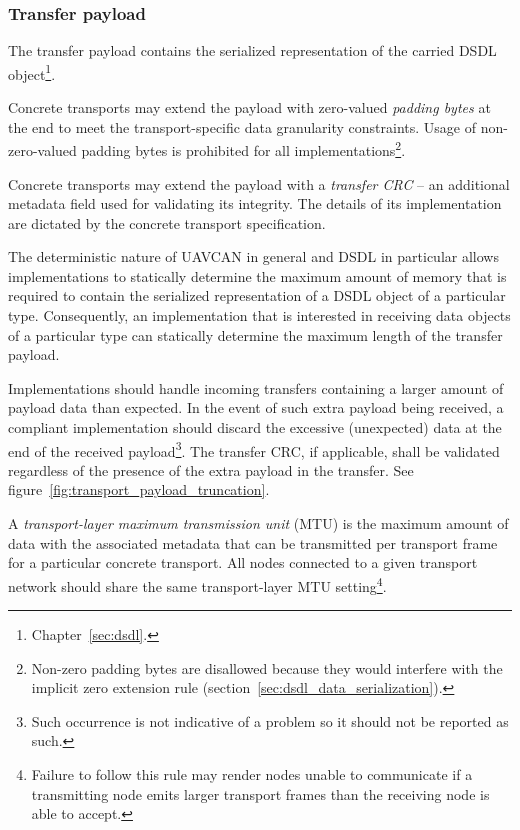 \subsubsection{Transfer payload}\label{sec:transport_transfer_payload}

The transfer payload contains the serialized representation of the carried
DSDL object\footnote{Chapter~\ref{sec:dsdl}.}.

Concrete transports may extend the payload with zero-valued \emph{padding bytes} at the end
to meet the transport-specific data granularity constraints.
Usage of non-zero-valued padding bytes is prohibited for all implementations\footnote{%
    Non-zero padding bytes are disallowed because they would interfere with the implicit zero extension rule
    (section~\ref{sec:dsdl_data_serialization}).
}.

Concrete transports may extend the payload with a \emph{transfer CRC}
-- an additional metadata field used for validating its integrity.
The details of its implementation are dictated by the concrete transport specification.

The deterministic nature of UAVCAN in general and DSDL in particular allows implementations to statically determine
the maximum amount of memory that is required to contain the serialized representation
of a DSDL object of a particular type.
Consequently, an implementation that is interested in receiving data objects of a particular type
can statically determine the maximum length of the transfer payload.

Implementations should handle incoming transfers containing a larger amount of payload data than expected.
In the event of such extra payload being received, a compliant implementation should
discard the excessive (unexpected) data at the end of the received payload\footnote{%
    Such occurrence is not indicative of a problem so it should not be reported as such.
}.
The transfer CRC, if applicable, shall be validated regardless of the presence of the extra payload in the transfer.
See figure~\ref{fig:transport_payload_truncation}.

A \emph{transport-layer maximum transmission unit} (MTU) is the maximum amount of data with the associated metadata
that can be transmitted per transport frame for a particular concrete transport.
All nodes connected to a given transport network should share the same transport-layer MTU setting\footnote{%
    Failure to follow this rule may render nodes unable to communicate if a transmitting node emits larger transport
    frames than the receiving node is able to accept.
}.

